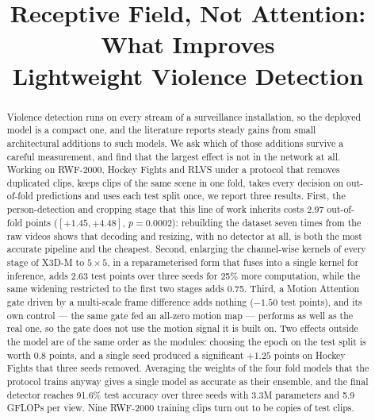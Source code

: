 \documentclass[conference]{IEEEtran}
\begin{document}
\title{Receptive Field, Not Attention: What Improves\\
Lightweight Violence Detection}

\author{
\and
{}
}

\maketitle

\begin{abstract}
Violence detection runs on every stream of a surveillance installation, so
the deployed model is a compact one, and the literature reports steady
gains from small architectural additions to such models. We ask which of
those additions survive a careful measurement, and find that the largest
effect is not in the network at all. Working on RWF-2000, Hockey Fights and
RLVS under a protocol that removes duplicated clips, keeps clips of the
same scene in one fold, takes every decision on out-of-fold predictions
and uses each test split once, we report three results. First, the
person-detection and cropping stage that this line of work inherits costs
2.97 out-of-fold points ($[+1.45, +4.48]$, $p=0.0002$): rebuilding the
dataset seven times from the raw videos shows that decoding and resizing,
with no detector at all, is both the most accurate pipeline and the
cheapest. Second, enlarging the channel-wise kernels of every stage of
X3D-M to $5\times5$, in a reparameterised form that fuses into a single
kernel for inference, adds 2.63 test points over three seeds for 25\% more
computation, while the same widening restricted to the first two stages
adds 0.75. Third, a Motion Attention gate driven by a multi-scale frame
difference adds nothing ($-1.50$ test points), and its own control --- the
same gate fed an all-zero motion map --- performs as well as the real one,
so the gate does not use the motion signal it is built on. Two effects
outside the model are of the same order as the modules: choosing the epoch
on the test split is worth 0.8 points, and a single seed produced a
significant $+1.25$ points on Hockey Fights that three seeds removed.
Averaging the weights of the four fold models that the protocol trains
anyway gives a single model as accurate as their ensemble, and the final
detector reaches 91.6\% test accuracy over three seeds with 3.3M
parameters and 5.9 GFLOPs per view. Nine RWF-2000 training clips turn out to be copies of test clips.
\end{abstract}
\end{document}
